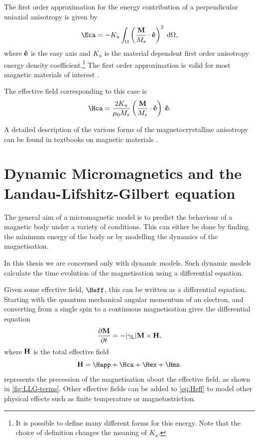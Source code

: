 The first order approximation for the energy contribution of a perpendicular uniaxial anisotropy is given by
\begin{equation}
  \Eca = -K_u \int_\magd \left( \frac{\Mv}{M_s} \cdot \ev \right)^2 \d \magd,
  \label{eq:36}
\end{equation}
where $\boldsymbol{\mathrm{\hat{e}}}$ is the easy axis and $K_u$ is the material dependent first order anisotropy energy density coefficient.\footnote{It is possible to define many different forms for this energy. Note that the choice of definition changes the meaning of $K_u$.}
The first order approximation is valid for most magnetic materials of interest \cite{Kronmuller2003}.

The effective field corresponding to this case is
\begin{equation}
  \Hca = \frac{2 K_u}{\mu_0 M_s} \left( \frac{\Mv}{M_s} \cdot \ev \right) \; \ev.
  \label{eq:Hca}
\end{equation}

A detailed description of the various forms of the magnetocrystalline anisotropy can be found in textbooks on magnetic materials \cite{Coey2010} \cite{Aharoni1996}.


\section{Dynamic Micromagnetics and the Landau-Lifshitz-Gilbert equation}
\label{sec:land-lifsch-gilb}

The general aim of a micromagnetic model is to predict the behaviour of a magnetic body under a variety of conditions.
This can either be done by finding the minimum energy of the body or by modelling the dynamics of the magnetisation.

In this thesis we are concerned only with dynamic models.
Such dynamic models calculate the time evolution of the magnetisation using a differential equation.

Given some effective field, $\Heff$, this can be written as a differential equation.
Starting with the quantum mechanical angular momentum of an electron, and converting from a single spin to a continuous magnetisation gives the differential equation \cite{Kronmuller2003}
\begin{equation}
  \label{eq:38}
  \frac{\partial \boldsymbol{\mathrm{M}}}{\partial t} = - {\left|{\gamma_{\mathrm{\tiny{L}}}} \right|} \boldsymbol{\mathrm{M}} \times \boldsymbol{\mathrm{H}},
\end{equation}
where $\boldsymbol{\mathrm{H}}$ is the total effective field
\begin{equation}
  \Hv = \Happ + \Hca + \Hex + \Hms.
  \label{eq:Heff}
\end{equation}
 represents the precession of the magnetisation about the effective field, as shown in \cref{fig:LLG-terms}. Other effective fields can be added to \cref{eq:Heff} to model other physical effects such as finite temperature or magnetostriction.

